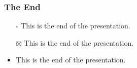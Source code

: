 \documentclass[aspectratio=169, xcolor=table, notheorems, hyperref={pdfpagelabels=false}]{beamer}
\begin{document}
\begin{frame}
\frametitle{The End}
\begin{itemize}
\item[$\square$] This is the end of the presentation.
\item[$\boxtimes$] This is the end of the presentation.
\item This is the end of the presentation.
\end{itemize}
\end{frame}

\end{document}
